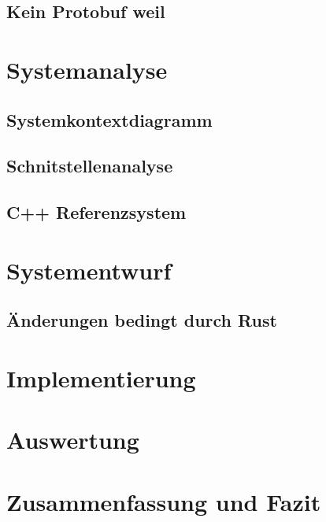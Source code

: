 \documentclass[
	12pt,
	table,
	bigheadings,
	ngerman,
	a4paper,
	BCOR5mm,
	DIV14,
	1.1headlines,
	pagesize,
	oneside,
	openright,
	titlepage,
	headsepline,
	nochapterprefix,
	bibtotoc,
	tocindent,
	listsindent,
	pointlessnumbers,
	cleardoubleempty,
	fleqn,
	halfparskip
]{scrbook}
\begin{document}
		\section{Kein Protobuf weil}
	
	\chapter{Systemanalyse}
		\section{Systemkontextdiagramm}
		\section{Schnitstellenanalyse}
		\section{C++ Referenzsystem}
		
	\chapter{Systementwurf}
		\section{Änderungen bedingt durch Rust}
	
	\chapter{Implementierung}
	\chapter{Auswertung}
	\chapter{Zusammenfassung und Fazit}
	
	
	
	
	\clearpage
	\printbibliography
	
	\clearpage
	\printglossaries

	\clearpage
	\listoffigures
	
	
\end{document}
